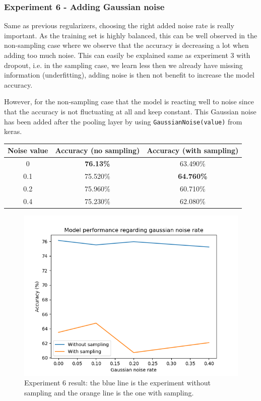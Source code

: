 \documentclass[11pt, openany]{report}
\theoremstyle{plain}
\theoremstyle{definition}
\theoremstyle{remark}
\begin{document}
\subsubsection{Experiment 6 - Adding Gaussian noise} \label{sec:noise-CIFAR10}
Same as previous regularizers, choosing the right added noise rate is really important. As the training set is highly balanced, this can be well observed in the non-sampling case where we observe that the accuracy is decreasing a lot when adding too much noise. This can easily be explained same as experiment 3 with dropout, i.e. in the sampling case, we learn less then we already have missing information (underfitting), adding noise is then not benefit to increase the model accuracy.

However, for the non-sampling case that the model is reacting well to noise since that the accuracy is not fluctuating at all and keep constant. This Gaussian noise has been added after the pooling layer by using \texttt{GaussianNoise(value)} from keras.  
 
\begin{center}
\begin{tabular}{|c|c|c|}
  \hline
  Noise value & Accuracy (no sampling) & Accuracy (with sampling) \\
  \hline
  0 & \textbf{76.13\%} &  63.490\% \\
  0.1 & 75.520\% & \textbf{64.760\%} \\
  0.2 & 75.960\% & 60.710\% \\
  0.4 & 75.230\% & 62.080\% \\
  \hline
\end{tabular}
\end{center}

\begin{figure}[H]
  \centering
  \includegraphics[scale=0.6]{Code/ch5-ModelPrototype/figures_result/gaussian_noise_graph.png}
  \caption{Experiment 6 result: the blue line is the experiment without sampling and the orange line is the one with sampling.}
  \label{fig:cifar_noise_res}
\end{figure}
\end{document}
